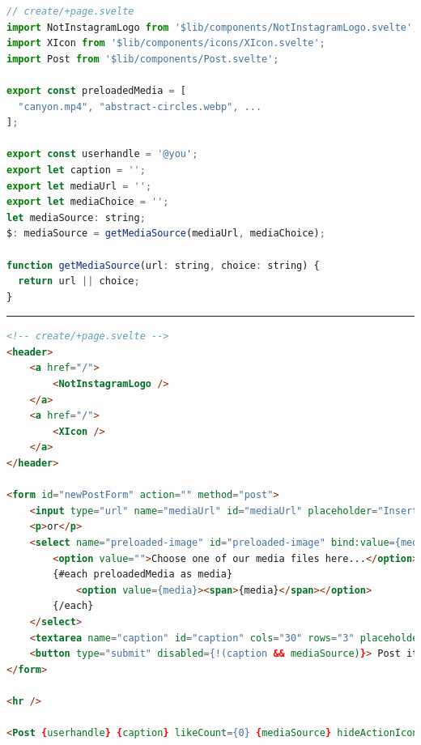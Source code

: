 \documentclass[a4paper, 12pt]{article}
\makeatletter
\renewcommand\listoffigures{%
  \section{\listfigurename}%
  \@mkboth{\MakeUppercase\listfigurename}{\MakeUppercase\listfigurename}%
  \@starttoc{lof}%
}
\makeatother
\begin{document}
\begin{lstlisting}[caption=Create page in Svelte (Script), label={lst:Svelte:Create:Script}, language=JavaScript]
// create/+page.svelte
import NotInstagramLogo from '$lib/components/NotInstagramLogo.svelte';
import XIcon from '$lib/components/icons/XIcon.svelte';
import Post from '$lib/components/Post.svelte';

export const preloadedMedia = [
  "canyon.mp4", "abstract-circles.webp", ...
];

export const userhandle = '@you';
export let caption = '';
export let mediaUrl = '';
export let mediaChoice = '';
let mediaSource: string;
$: mediaSource = getMediaSource(mediaUrl, mediaChoice);

function getMediaSource(url: string, choice: string) {
  return url || choice;
}
\end{lstlisting}

\vspace{0.5cm} \hrule \vspace{0.5cm}

\begin{lstlisting}[caption=Create page in Svelte (Template), label={lst:Svelte:Create:Template}, language=HTML, firstnumber=20]
<!-- create/+page.svelte -->
<header>
	<a href="/">
		<NotInstagramLogo />
	</a>
	<a href="/">
		<XIcon />
	</a>
</header>

<form id="newPostForm" action="" method="post">
	<input type="url" name="mediaUrl" id="mediaUrl" placeholder="Insert your media URL here..." bind:value={mediaUrl}/>
	<p>or</p>
	<select name="preloaded-image" id="preloaded-image" bind:value={mediaChoice}>
		<option value="">Choose one of our media files here...</option>
		{#each preloadedMedia as media}
			<option value={media}><span>{media}</span></option>
		{/each}
	</select>
	<textarea name="caption" id="caption" cols="30" rows="3" placeholder="Type your caption here" bind:value={caption} />
	<button type="submit" disabled={!(caption && mediaSource)}> Post it! </button>
</form>

<hr />

<Post {userhandle} {caption} likeCount={0} {mediaSource} hideActionIcons={true} />
\end{lstlisting}

\pagebreak

\listoffigures

\pagebreak

\printnoidxglossary[
  type=\acronymtype,
  nonumberlist,
  style=long
]
\end{document}
